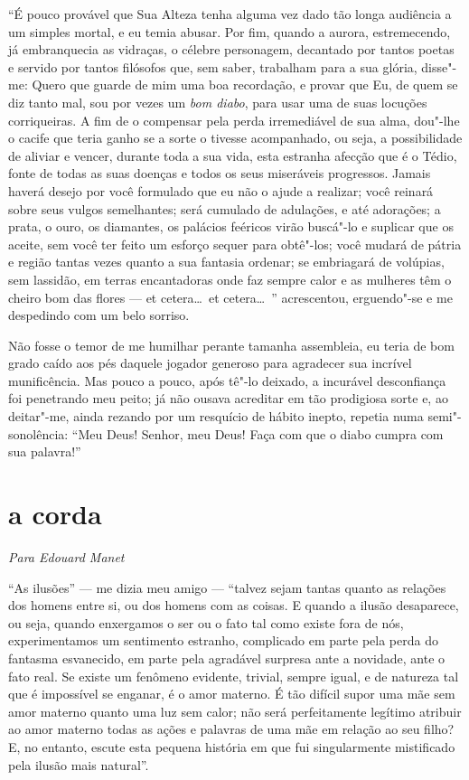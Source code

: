 “É pouco provável que Sua Alteza tenha alguma vez dado tão longa
audiência a um simples mortal, e eu temia abusar. Por fim, quando a
aurora, estremecendo, já embranquecia as vidraças, o célebre
personagem, decantado por tantos poetas e servido por tantos filósofos
que, sem saber, trabalham para a sua glória, disse"-me: Quero
que guarde de mim uma boa recordação, e provar que Eu, de
quem se diz tanto mal, sou por vezes um \textit{bom diabo}, para usar uma de
suas locuções corriqueiras. A fim de o compensar pela perda
irremediável de sua alma, dou"-lhe o cacife que teria ganho se a
sorte o tivesse acompanhado, ou seja, a possibilidade de aliviar e 
vencer, durante toda a sua vida, esta estranha afecção que é o Tédio,
fonte de todas as suas doenças e todos os seus miseráveis progressos.
Jamais haverá desejo por você formulado que eu não o ajude a realizar;
você reinará sobre seus vulgos semelhantes; será cumulado de
adulações, e até adorações; a prata, o ouro, os diamantes, os
palácios feéricos virão buscá"-lo e suplicar que os aceite, sem
você ter feito um esforço sequer para obtê"-los; você mudará de
pátria e região tantas vezes quanto a sua fantasia ordenar; se
embriagará de volúpias, sem lassidão, em terras encantadoras onde faz
sempre calor e as mulheres têm o cheiro bom das flores
--- et cetera\ldots\  et cetera\ldots\ '' acrescentou, erguendo"-se e
me despedindo com um belo sorriso.

\quebra

Não fosse o temor de me humilhar perante tamanha assembleia, eu teria
de bom grado caído aos pés daquele jogador generoso para agradecer
sua incrível munificência. Mas pouco a pouco, após tê"-lo deixado, a
incurável desconfiança foi penetrando meu peito; já não ousava acreditar em
tão prodigiosa sorte e, ao deitar"-me, ainda rezando por um
resquício de hábito inepto, repetia numa semi"-sonolência:
“Meu Deus! Senhor, meu Deus! Faça com que o diabo cumpra
com sua palavra!''

\quebra\section[A corda]{a corda}
\begin{flushright}
\textit{Para Edouard Manet}
\end{flushright}

“As ilusões'' --- me dizia meu amigo --- “talvez sejam
tantas quanto as relações dos homens entre si, ou dos homens com as
coisas. E quando a ilusão desaparece, ou seja, quando enxergamos o ser
ou o fato tal como existe fora de nós, experimentamos um sentimento
estranho, complicado em parte pela perda do fantasma esvanecido, em
parte pela agradável surpresa ante a novidade, ante o fato real.
Se existe um fenômeno evidente, trivial, sempre igual, e de natureza
tal que é impossível se enganar, é o amor materno. É tão difícil supor
uma mãe sem amor materno quanto uma luz sem calor; não será
perfeitamente legítimo atribuir ao amor materno todas as ações e
palavras de uma mãe em relação ao seu filho? E, no entanto, escute esta
pequena história em que fui singularmente mistificado pela ilusão mais
natural''.

